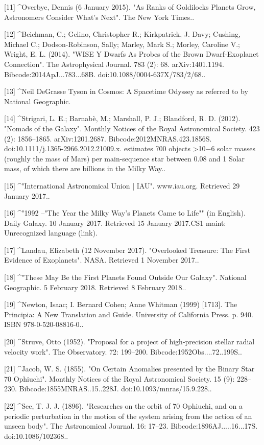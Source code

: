 [11]
^Overbye, Dennis (6 January 2015). "As Ranks of Goldilocks Planets Grow, Astronomers Consider What's Next". The New York Times..

[12]
^Beichman, C.; Gelino, Christopher R.; Kirkpatrick, J. Davy; Cushing, Michael C.; Dodson-Robinson, Sally; Marley, Mark S.; Morley, Caroline V.; Wright, E. L. (2014). "WISE Y Dwarfs As Probes of the Brown Dwarf-Exoplanet Connection". The Astrophysical Journal. 783 (2): 68. arXiv:1401.1194. Bibcode:2014ApJ...783...68B. doi:10.1088/0004-637X/783/2/68..

[13]
^Neil DeGrasse Tyson in Cosmos: A Spacetime Odyssey as referred to by National Geographic.

[14]
^Strigari, L. E.; Barnabè, M.; Marshall, P. J.; Blandford, R. D. (2012). "Nomads of the Galaxy". Monthly Notices of the Royal Astronomical Society. 423 (2): 1856–1865. arXiv:1201.2687. Bibcode:2012MNRAS.423.1856S. doi:10.1111/j.1365-2966.2012.21009.x. estimates 700 objects >10−6 solar masses (roughly the mass of Mars) per main-sequence star between 0.08 and 1 Solar mass, of which there are billions in the Milky Way..

[15]
^"International Astronomical Union | IAU". www.iau.org. Retrieved 29 January 2017..

[16]
^"1992 --"The Year the Milky Way's Planets Came to Life"" (in English). Daily Galaxy. 10 January 2017. Retrieved 15 January 2017.CS1 maint: Unrecognized language (link).

[17]
^Landau, Elizabeth (12 November 2017). "Overlooked Treasure: The First Evidence of Exoplanets". NASA. Retrieved 1 November 2017..

[18]
^"These May Be the First Planets Found Outside Our Galaxy". National Geographic. 5 February 2018. Retrieved 8 February 2018..

[19]
^Newton, Isaac; I. Bernard Cohen; Anne Whitman (1999) [1713]. The Principia: A New Translation and Guide. University of California Press. p. 940. ISBN 978-0-520-08816-0..

[20]
^Struve, Otto (1952). "Proposal for a project of high-precision stellar radial velocity work". The Observatory. 72: 199–200. Bibcode:1952Obs....72..199S..

[21]
^Jacob, W. S. (1855). "On Certain Anomalies presented by the Binary Star 70 Ophiuchi". Monthly Notices of the Royal Astronomical Society. 15 (9): 228–230. Bibcode:1855MNRAS..15..228J. doi:10.1093/mnras/15.9.228..

[22]
^See, T. J. J. (1896). "Researches on the orbit of 70 Ophiuchi, and on a periodic perturbation in the motion of the system arising from the action of an unseen body". The Astronomical Journal. 16: 17–23. Bibcode:1896AJ.....16...17S. doi:10.1086/102368..

